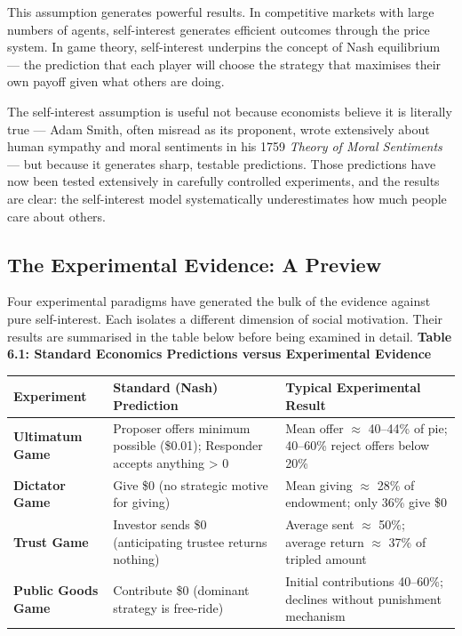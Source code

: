 \documentclass[12pt, letterpaper]{article}
\begin{document}
This assumption generates powerful results. In competitive markets with large numbers of agents, self-interest generates efficient outcomes through the price system. In game theory, self-interest underpins the concept of Nash equilibrium --- the prediction that each player will choose the strategy that maximises their own payoff given what others are doing.

The self-interest assumption is useful not because economists believe it is literally true --- Adam Smith, often misread as its proponent, wrote extensively about human sympathy and moral sentiments in his 1759 \textit{Theory of Moral Sentiments} --- but because it generates sharp, testable predictions. Those predictions have now been tested extensively in carefully controlled experiments, and the results are clear: the self-interest model systematically underestimates how much people care about others.


\subsection{The Experimental Evidence: A Preview}


Four experimental paradigms have generated the bulk of the evidence against pure self-interest. Each isolates a different dimension of social motivation. Their results are summarised in the table below before being examined in detail.
\newpage
\textbf{Table 6.1: Standard Economics Predictions versus Experimental Evidence}


\begin{table}[H]
\centering
\small
\begin{tabularx}{\linewidth}{lYY}
\toprule
Experiment & Standard (Nash) Prediction & Typical Experimental Result \\
\midrule
\textbf{Ultimatum Game} & Proposer offers minimum possible (\$0.01); Responder accepts anything > 0 & Mean offer $\approx$ 40--44\% of pie; 40--60\% reject offers below 20\% \\
\textbf{Dictator Game} & Give \$0 (no strategic motive for giving) & Mean giving $\approx$ 28\% of endowment; only 36\% give \$0 \\
\textbf{Trust Game} & Investor sends \$0 (anticipating trustee returns nothing) & Average sent $\approx$ 50\%; average return $\approx$ 37\% of tripled amount \\
\textbf{Public Goods Game} & Contribute \$0 (dominant strategy is free-ride) & Initial contributions 40--60\%; declines without punishment mechanism \\
\bottomrule
\end{tabularx}
\end{table}
\end{document}
